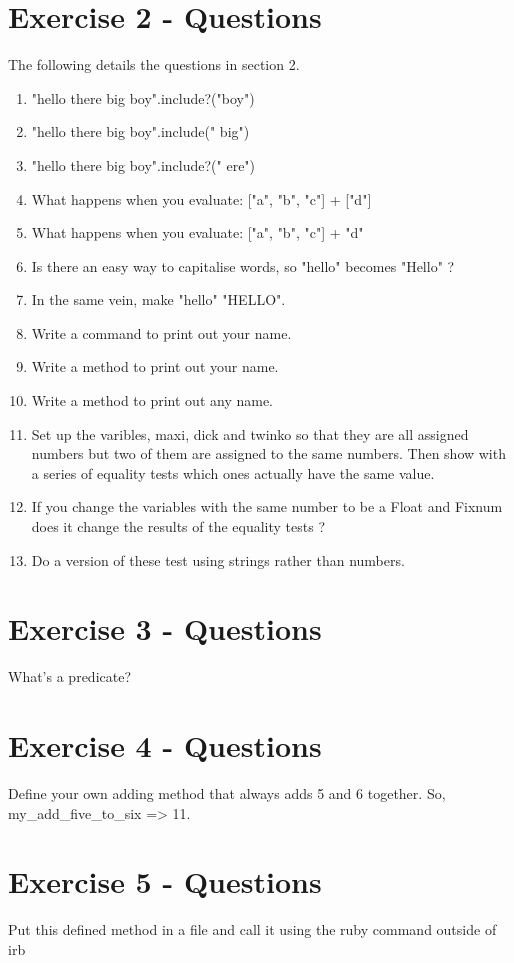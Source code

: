 \documentclass{scrreprt}
\begin{document}
	\section{Exercise 2 - Questions} \label{E2Q}
	The following details the questions in section 2.
	\begin{enumerate}
		\item "hello there big boy".include?("boy")
		\item "hello there big boy".include(" big")
		\item "hello there big boy".include?(" ere")
		\item What happens when you evaluate: ["a", "b", "c"] + ["d"]
		\item What happens when you evaluate: ["a", "b", "c"] + "d"
		\item Is there an easy way to capitalise words, so "hello" becomes "Hello" ?
		\item In the same vein, make "hello" "HELLO".
		\item Write a command to print out your name.
		\item Write a method to print out your name.
		\item Write a method to print out any name.
		\item Set up the varibles, maxi, dick and twinko so that they are all assigned numbers but two of them are assigned to the same numbers. Then show with a series of equality tests which ones actually have the same value.
		\item If you change the variables with the same number to be a Float and Fixnum does it change the results of the equality tests ?
		\item Do a version of these test using strings rather than numbers.
	\end{enumerate}
	
	
		
	\section{Exercise 3 - Questions}
	What's a predicate?

	\section{Exercise 4 - Questions}
Define your own adding method that always adds 5 and 6 together.
So, my\_add\_five\_to\_six => 11.

		
\section{Exercise 5 - Questions}
Put this defined method in a file and call it using the ruby command outside of irb

		
\end{document}
